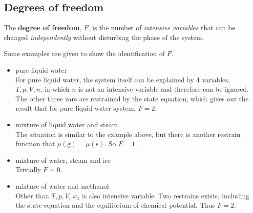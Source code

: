 \subsection{Degrees of freedom}
\begin{definition}
    The \textbf{degree of freedom}, $F$, is the number of \emph{intensive variables} that can be changed \emph{independently} without disturbing the phase of the system.
\end{definition}
\begin{example}
    Some examples are given to show the identification of $F$.\\
    \begin{itemize}
        \item pure liquid water\\
        For pure liquid water, the system itself can be explained by 4 variables, $T, p, V, n$, in which $n$ is not an intensive variable and therefore can be ignored. The other three vars are restrained by the state equation, which gives out the result that for pure liquid water system, $F=2$.
        \item mixture of liquid water and steam\\
        The situation is similar to the example above, but there is another restrain function that $\mu(\text{g})=\mu(\text{s})$. So $F=1$.
        \item mixture of water, steam and ice\\
        Trivially $F=0$.
        \item mixture of water and methanol\\
        Other than $T, p, V$, $x_1$ is also intensive variable. Two restrains exists, including the state equation and the equilibrium of chemical potential. Thus $F=2$.
    \end{itemize}
\end{example}
